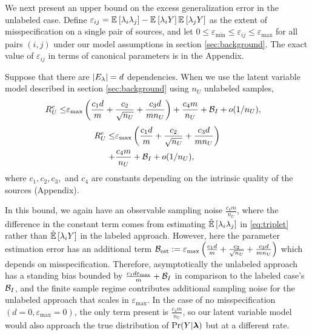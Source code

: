We next present an upper bound on the excess generalization error in the unlabeled case. Define $\varepsilon_{ij} = \mathbb{E}_{}\left[\lambda_i \lambda_j\right] - \mathbb{E}_{}\left[\lambda_i Y\right] \mathbb{E}_{}\left[\lambda_j Y\right]$ as the extent of misspecification on a single pair of sources, and let $0 \le \varepsilon_{\min} \le \varepsilon_{ij} \le \varepsilon_{\max}$ for all pairs $(i, j)$ under our model assumptions in section \ref{sec:background}. The exact value of $\varepsilon_{ij}$ in terms of canonical parameters 
is in the Appendix. 
\begin{theorem}
Suppose that there are $|E_{\lambda}| = d$ dependencies. When we use the latent variable model described in section \ref{sec:background} using $n_U$ unlabeled samples, 
\ifsinglecolumn
\begin{align}
    R_U^{e} \le  & \varepsilon_{\max} \left(\frac{c_1 d}{m} + \frac{c_2}{\sqrt{n_U}} + \frac{c_3d }{m n_U}\right) + \frac{c_4 m}{n_U} + \mathcal{B}_I + o(1/n_U), 
\end{align}
\else
\begin{align}
    R_U^{e} \le  & \varepsilon_{\max} \left(\frac{c_1 d}{m} + \frac{c_2}{\sqrt{n_U}} + \frac{c_3d }{m n_U}\right) \\
    + &\frac{c_4 m}{n_U} + \mathcal{B}_I + o(1/n_U), \nonumber
\end{align}
\fi
where $c_1, c_2, c_3,$ and $c_4$ are constants depending on the intrinsic quality of the sources (Appendix). 
\label{thm:unlabeled}
\end{theorem}

In this bound, we again have an observable sampling noise $\frac{c_4 m}{n_U}$, where the difference in the constant term comes from estimating $\hat{\mathbb{E}}\left[\lambda_i \lambda_j\right]$ in \eqref{eq:triplet} rather than $\hat{\mathbb{E}}\left[\lambda_i Y\right]$ in the labeled approach. However, here the parameter estimation error has an additional term $\mathcal{B}_{\mathrm{est}} :=\varepsilon_{\max} \left(\frac{c_1 d}{m} + \frac{c_2 }{\sqrt{n_U}} + \frac{c_3 d}{m n_U}\right)$ which depends on misspecification. Therefore, asymptotically the unlabeled approach has a standing bias bounded by $\frac{c_1 d \varepsilon_{\max}}{m} +\mathcal{B}_I$ in comparison to the labeled case's $\mathcal{B}_I$, and the finite sample regime contributes additional sampling noise for the unlabeled approach that scales in $\varepsilon_{\max}$. In the case of no misspecification $(d = 0, \varepsilon_{\max} = 0)$, the only term present is $\frac{c_4 m}{n_U}$, so our latent variable model would also approach the true distribution of $\Pr(Y | \bm{\lambda})$ but at a different rate. 

